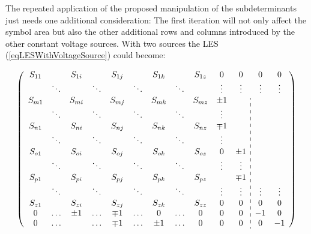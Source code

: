 The repeated application of the proposed manipulation of the
subdeterminants just needs one additional consideration: The first
iteration will not only affect the symbol area but also the other
additional rows and columns introduced by the other constant voltage
sources. With two sources the LES (\ref{eqLESWithVoltageSource}) could
become:

\begin{equation}
\label{eqLESWith2VoltageSources}
\left(
\begin{array}{ccccccccccc:cc}
S_{11} &        & S_{1i} &        & S_{1j} &        & S_{1k} &        & S_{1z} & 0      & 0      & 0      & 0      \\
       & \ddots &        & \ddots &        & \ddots &        & \ddots &        & \vdots & \vdots & \vdots & \vdots \\
S_{m1} &        & S_{mi} &        & S_{mj} &        & S_{mk} &        & S_{mz} & \pm 1  &        &        &        \\
       & \ddots &        & \ddots &        & \ddots &        & \ddots &        & \vdots &        &        &        \\
S_{n1} &        & S_{ni} &        & S_{nj} &        & S_{nk} &        & S_{nz} & \mp 1  &        &        &        \\
       & \ddots &        & \ddots &        & \ddots &        & \ddots &        & \vdots &        &        &        \\
S_{o1} &        & S_{oi} &        & S_{oj} &        & S_{ok} &        & S_{oz} & 0      & \pm 1  &        &        \\
       & \ddots &        & \ddots &        & \ddots &        & \ddots &        & \vdots & \vdots &        &        \\
S_{p1} &        & S_{pi} &        & S_{pj} &        & S_{pk} &        & S_{pz} &        & \mp 1  &        &        \\
       & \ddots &        & \ddots &        & \ddots &        & \ddots &        & \vdots & \vdots & \vdots & \vdots \\
S_{z1} &        & S_{zi} &        & S_{zj} &        & S_{zk} &        & S_{zz} & 0      & 0      & 0      & 0      \\
0      & \ldots & \pm 1  & \ldots & \mp 1  & \ldots & 0      & \ldots & 0      & 0      & 0      & -1     & 0      \\
0      & \ldots &        & \ldots & \mp 1  & \ldots & \pm 1  & \ldots & 0      & 0      & 0      & 0      & -1     \\
\end{array}
\right)
\end{equation}

